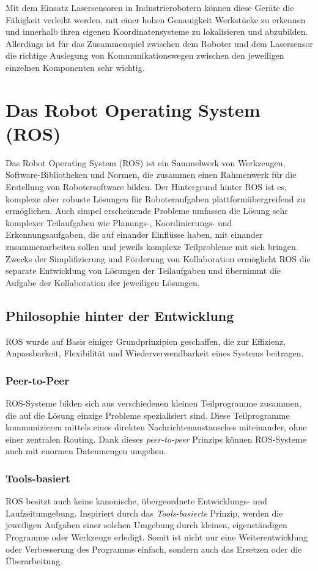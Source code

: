 Mit dem Einsatz Lasersensoren in Industrierobotern können diese Geräte die Fähigkeit verleiht werden, mit einer hohen Genauigkeit Werkstücke zu erkennen und innerhalb ihren eigenen Koordinatensysteme zu lokalisieren und abzubilden. Allerdings ist für das Zusammenspiel zwischen dem Roboter und dem Lasersensor die richtige Auslegung von Kommunikationswegen zwischen den jeweiligen einzelnen Komponenten sehr wichtig.

\section{Das Robot Operating System (ROS)} \label{sec:ROS}
Das Robot Operating System (ROS) ist ein Sammelwerk von Werkzeugen, Software-Bibliotheken und Normen, die zusammen einen Rahmenwerk für die Erstellung von Robotersoftware bilden. Der Hintergrund hinter ROS ist es, komplexe aber robuste Lösungen für Roboteraufgaben plattformübergreifend zu ermöglichen. Auch simpel erscheinende Probleme umfassen die Lösung sehr komplexer Teilaufgaben wie Planungs-, Koordinierungs- und Erkennungsaufgaben, die auf einander Einflüsse haben, mit einander zusammenarbeiten sollen und jeweils komplexe Teilprobleme mit sich bringen. Zwecks der Simplifizierung und Förderung von Kollaboration ermöglicht ROS die separate Entwicklung von Lösungen der Teilaufgaben und übernimmt die Aufgabe der Kollaboration der jeweiligen Lösungen. \autocite[3]{QuigleyROS2015}

\subsection{Philosophie hinter der Entwicklung}

ROS wurde auf Basis einiger Grundprinzipien geschaffen, die zur Effizienz, Anpassbarkeit, Flexibilität und Wiederverwendbarkeit eines Systems beitragen. 

\subsubsection{Peer-to-Peer}
	ROS-Systeme bilden sich aus verschiedenen kleinen Teilprogramme zusammen, die auf die Lösung einzige Probleme spezialisiert sind. Diese Teilprogramme kommunizieren mittels eines direkten Nachrichtenaustausches miteinander, ohne einer zentralen Routing. Dank dieses \emph{peer-to-peer} Prinzips können ROS-Systeme auch mit enormen Datenmengen umgehen. \autocite[3]{QuigleyROS2015} 
\subsubsection{Tools-basiert}
	ROS besitzt auch keine kanonische, übergeordnete Entwicklungs- und Laufzeitumgebung. Inspiriert durch das \emph{Tools-basierte} Prinzip, werden die jeweiligen Aufgaben einer solchen Umgebung durch kleinen, eigenständigen Programme oder Werkzeuge erledigt. Somit ist nicht nur eine Weiterentwicklung oder Verbesserung des Programms einfach, sondern auch das Ersetzen oder die Überarbeitung. \autocite[3]{QuigleyROS2015} 
